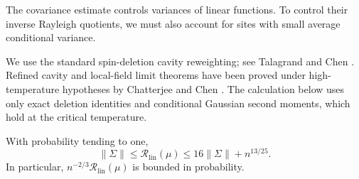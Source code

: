 The covariance estimate controls variances of linear functions.  To
control their inverse Rayleigh quotients, we must also account for sites
with small average conditional variance.

We use the standard spin-deletion cavity reweighting; see Talagrand
\cite{Talagrand2011MeanFieldI} and Chen \cite{Chen2013CavityLocal}.
Refined cavity and local-field limit theorems have been proved under
high-temperature hypotheses by Chatterjee \cite{Chatterjee2010Stein}
and Chen \cite{Chen2013CavityLocal}. The calculation below uses only
exact deletion identities and conditional Gaussian second moments, which
hold at the critical temperature.

\begin{proposition}\label{prop:linear-scale}
With probability tending to one,
\begin{equation}\label{eq:linear-covariance-comparison}
 \|\Sigma\|\le\mathcal R_{\mathrm{lin}}(\mu)
 \le16\|\Sigma\|+n^{13/25}.
\end{equation}
In particular, $n^{-2/3}\mathcal R_{\mathrm{lin}}(\mu)$ is bounded in
probability.
\end{proposition}

